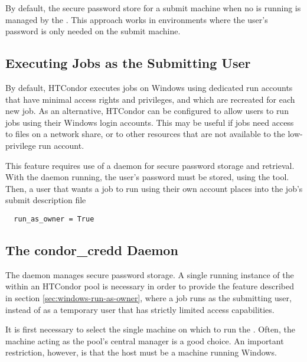 By default, the secure password store for a submit machine when no
 is running is managed by the .
This approach works in environments where
the user's password is only needed on the submit machine.

\subsection{\label{sec:windows-run-as-owner}Executing Jobs as the Submitting User}

By default, HTCondor executes jobs on Windows using dedicated run
accounts that have minimal access rights and privileges,
and which are recreated for each new job.
As an alternative, HTCondor can be configured to allow users to run jobs using
their Windows login accounts. 
This may be useful if jobs need access to files on a network share,
or to other resources that are not available to the low-privilege run account.

This feature requires use of a  daemon for secure
password storage and retrieval. 
With the  daemon running,
the user's password must be stored, using the  tool.
Then,
a user that wants a job to run using their own account
places into the job's submit description file
\begin{verbatim}
  run_as_owner = True
\end{verbatim}

\subsection{\label{sec:credd}The condor\_credd Daemon}
The  daemon manages secure password storage.
A single running instance of the  within an HTCondor pool
is necessary in order to provide the feature described in 
section \ref{sec:windows-run-as-owner},
where a job runs as the submitting user, 
instead of as a temporary user that has strictly limited access capabilities.

It is first necessary to select
the single machine on which to run the . 
Often, the machine acting as the pool's central manager is a good choice.
An important restriction, however, is that the  host must be a
machine running Windows.

